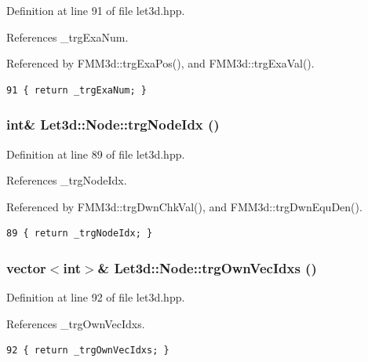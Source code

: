Definition at line 91 of file let3d.hpp.

References \_\-trg\-Exa\-Num.

Referenced by FMM3d::trg\-Exa\-Pos(), and FMM3d::trg\-Exa\-Val().

\footnotesize\begin{verbatim}91 { return _trgExaNum; }
\end{verbatim}\normalsize 


\subsubsection{\setlength{\rightskip}{0pt plus 5cm}int\& Let3d::Node::trg\-Node\-Idx ()\hspace{0.3cm}{\tt  [inline]}}\label{classLet3d_1_1Node_445b53af81e189698d873846e579c58a_445b53af81e189698d873846e579c58a}




Definition at line 89 of file let3d.hpp.

References \_\-trg\-Node\-Idx.

Referenced by FMM3d::trg\-Dwn\-Chk\-Val(), and FMM3d::trg\-Dwn\-Equ\-Den().

\footnotesize\begin{verbatim}89 { return _trgNodeIdx; }
\end{verbatim}\normalsize 


\subsubsection{\setlength{\rightskip}{0pt plus 5cm}vector$<$int$>$\& Let3d::Node::trg\-Own\-Vec\-Idxs ()\hspace{0.3cm}{\tt  [inline]}}\label{classLet3d_1_1Node_39591ce5eaa09956b048f9cbe6551c79_39591ce5eaa09956b048f9cbe6551c79}




Definition at line 92 of file let3d.hpp.

References \_\-trg\-Own\-Vec\-Idxs.

\footnotesize\begin{verbatim}92 { return _trgOwnVecIdxs; }
\end{verbatim}\normalsize 


